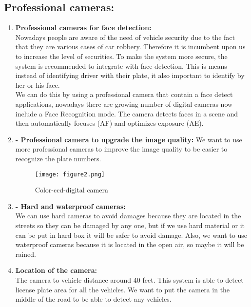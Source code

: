  \subsection{Professional cameras:}
\begin{enumerate}
	\item \textbf{Professional cameras for face detection:}\\
	Nowadays people are aware of the need of vehicle
	security due to the fact that they are various cases of car
	robbery. Therefore it is incumbent upon us to increase
	the level of securities. To make the system more secure,
	the system is recommended to integrate with face
	detection. This is means instead of identifying driver
	with their plate, it also important to identify by her or
	his face.\\
     We can do this by using a professional camera that
	contain a face detect applications, nowadays there are
	growing number of digital cameras now include a Face
	Recognition mode. The camera detects faces in a scene
	and then automatically focuses (AF) and optimizes
	exposure (AE).
	\item \textbf{- Professional camera to upgrade the image quality:}
	We want to use more professional cameras to improve
	the image quality to be easier to recognize the plate
	numbers.
	\begin{figure}[h]
		\centering
		\texttt{[image: figure2.png]}
		\caption*{Color-ccd-digital camera	}
	\end{figure}
	\item \textbf{- Hard and waterproof cameras:}\\
	We can use hard cameras to avoid damages because
	they are located in the streets so they can be damaged
	by any one, but if we use hard material or it can be put
	in hard box it will be safer to avoid damage. Also, we
	want to use waterproof cameras because it is located in
	the open air, so maybe it will be rained.
	\item \textbf{Location of the camera:}\\
	The camera to vehicle distance around 40 feet. This
	system is able to detect license plate area for all the
	vehicles. We want to put the camera in the middle of
	the road to be able to detect any vehicles.
\end{enumerate}

